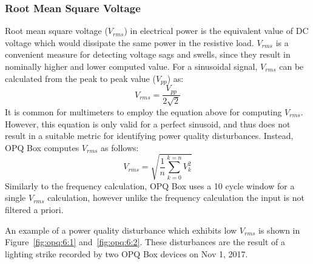 \subsubsection{Root Mean Square Voltage}\label{subsec:root-mean-square-voltage}

Root mean square voltage ($V_{rms}$) in electrical power is the equivalent value of DC voltage which would dissipate the same power in the resistive load. $V_{rms}$ is a convenient measure for detecting voltage sags and swells, since they result in nominally higher and lower computed value.
For a sinusoidal signal, $V_{rms}$ can be calculated from the peak to peak value ($V_{pp}$) as:
\begin{equation} \label{eq:2}
	V_{rms} = \frac{V_{pp}}{2\sqrt{2}}
\end{equation}
It is common for multimeters to employ the equation above for computing $V_{rms}$.
However, this equation is only valid for a perfect sinusoid, and thus does not result in a suitable metric for identifying power quality disturbances.
Instead, OPQ Box computes $V_{rms}$ as follows:
\begin{equation} \label{eq:3}
	V_{rms} = \sqrt{\frac{1}{n}\sum\limits_{k=0}^{k=n}V_{k}^{2}}
\end{equation}
Similarly to the frequency calculation, OPQ Box uses a 10 cycle window for a single $V_{rms}$ calculation, however unlike the frequency calculation the input is not filtered a priori.

An example of a power quality disturbance which exhibits low $V_{rms}$ is shown in Figure~\ref{fig:opq:6:1} and~\ref{fig:opq:6:2}.
These disturbances are the result of a lighting strike recorded by two OPQ Box devices on Nov 1, 2017.

